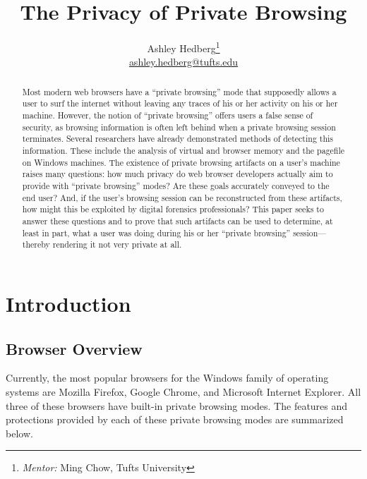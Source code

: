 \documentclass[pdftex,letterpaper,titlepage,12pt]{article}
\begin{document}
  \singlespacing
  \title{The Privacy of Private Browsing}
  \author{Ashley Hedberg\thanks{\emph{Mentor:} Ming Chow, Tufts University} \\
  \href{mailto:ashley.hedberg@tufts.edu}{ashley.hedberg@tufts.edu}}
  \date{}
  \maketitle
  
  \begin{abstract}
  Most modern web browsers have a ``private browsing'' mode that supposedly 
  allows a user to surf the internet without leaving any traces of his or her
  activity on his or her machine. However, the notion of ``private browsing'' 
  offers users a false sense of security, as browsing information is often left
  behind when a private browsing session terminates. Several researchers have 
  already demonstrated methods of detecting this information. These include the
  analysis of virtual and browser memory and the pagefile on Windows machines.
  The existence of private browsing artifacts on a user’s machine raises many 
  questions: how much privacy do web browser developers actually aim to provide
  with ``private browsing'' modes? Are these goals accurately conveyed to the 
  end user? And, if the user’s browsing session can be reconstructed from these
  artifacts, how might this be exploited by digital forensics professionals? 
  This paper seeks to answer these questions and to prove that such artifacts 
  can be used to determine, at least in part, what a user was doing during his 
  or her ``private browsing'' session---thereby rendering it not very private 
  at all.
  \end{abstract}

  \doublespacing
  \section{Introduction}
    \subsection{Browser Overview}
    Currently, the most popular browsers for the Windows family of operating 
    systems are Mozilla Firefox, Google Chrome, and Microsoft Internet 
    Explorer. All three of these browsers have built-in private browsing modes.
    The features and protections provided by each of these private browsing
    modes are summarized below.\cite{verdi13}\cite{google13}\cite{ie13}
\end{document}
